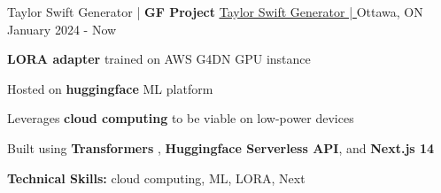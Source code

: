 \begin{cventries}

	\cventry
	{Taylor Swift Generator | \textbf{GF Project}} %
	{\underline{\href{https://lefan.ca/silly-goose}{Taylor Swift Generator | \ExternalLink}}} %
	{Ottawa, ON} %
	{January 2024 - Now} %
	{
		\begin{cvitems} %
      \item {\textbf{LORA adapter} trained on AWS G4DN GPU instance}
      \item {Hosted on \textbf{huggingface} ML platform}
			\item {Leverages \textbf{cloud computing} to be viable on low-power devices}
			\item {Built using \textbf{Transformers} , \textbf{Huggingface Serverless API}, and \textbf{Next.js 14}}
			\item {\textbf{Technical Skills:} cloud computing, ML, LORA, Next}
		\end{cvitems}
	}


\end{cventries}
